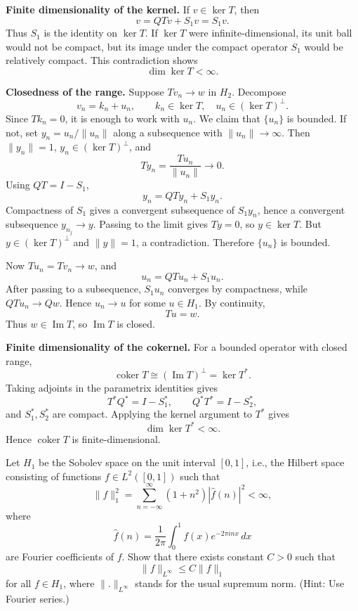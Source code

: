 \begin{solution}
\textbf{Finite dimensionality of the kernel.}
If \(v\in\ker T\), then
\[
v=QTv+S_1v=S_1v.
\]
Thus \(S_1\) is the identity on \(\ker T\). If \(\ker T\) were infinite-dimensional, its unit ball would not be compact, but its image under the compact operator \(S_1\) would be relatively compact. This contradiction shows
\[
\dim\ker T<\infty.
\]

\textbf{Closedness of the range.}
Suppose \(Tv_n\to w\) in \(H_2\). Decompose
\[
v_n=k_n+u_n,\qquad k_n\in\ker T,\quad u_n\in(\ker T)^\perp.
\]
Since \(Tk_n=0\), it is enough to work with \(u_n\). We claim that \(\{u_n\}\) is bounded. If not, set \(y_n=u_n/\|u_n\|\) along a subsequence with \(\|u_n\|\to\infty\). Then \(\|y_n\|=1\), \(y_n\in(\ker T)^\perp\), and
\[
Ty_n=\frac{Tu_n}{\|u_n\|}\to0.
\]
Using \(QT=I-S_1\),
\[
y_n=QTy_n+S_1y_n.
\]
Compactness of \(S_1\) gives a convergent subsequence of \(S_1y_n\), hence a convergent subsequence \(y_{n_j}\to y\). Passing to the limit gives \(Ty=0\), so \(y\in\ker T\). But \(y\in(\ker T)^\perp\) and \(\|y\|=1\), a contradiction. Therefore \(\{u_n\}\) is bounded.

Now \(Tu_n=Tv_n\to w\), and
\[
u_n=QTu_n+S_1u_n.
\]
After passing to a subsequence, \(S_1u_n\) converges by compactness, while \(QTu_n\to Qw\). Hence \(u_n\to u\) for some \(u\in H_1\). By continuity,
\[
Tu=w.
\]
Thus \(w\in\operatorname{Im}T\), so \(\operatorname{Im}T\) is closed.

\textbf{Finite dimensionality of the cokernel.}
For a bounded operator with closed range,
\[
\operatorname{coker}T\cong(\operatorname{Im}T)^\perp=\ker T^*.
\]
Taking adjoints in the parametrix identities gives
\[
T^*Q^*=I-S_1^*,\qquad Q^*T^*=I-S_2^*,
\]
and \(S_1^*,S_2^*\) are compact. Applying the kernel argument to \(T^*\) gives
\[
\dim\ker T^*<\infty.
\]
Hence \(\operatorname{coker}T\) is finite-dimensional.
\end{solution}


\begin{exercise}
\label{analysis:2015:6}
Let $H_1$ be the Sobolev space on the unit interval $[0,1]$, i.e., the Hilbert space consisting of functions $f\in L^2([0,1])$ such that
\[
\|f\|_1^2 = \sum_{n=-\infty}^{\infty}(1+n^2)|\hat{f}(n)|^2 < \infty,
\]
where
\[
\hat{f}(n) = \frac{1}{2\pi}\int_0^1 f(x)e^{-2\pi inx}\,dx
\]
are Fourier coefficients of $f$. Show that there exists constant $C>0$ such that
\[
\|f\|_{L^{\infty}} \leq C\|f\|_1
\]
for all $f\in H_1$, where $\|.\|_{L^{\infty}}$ stands for the usual supremum norm. (Hint: Use Fourier series.)
\end{exercise}

